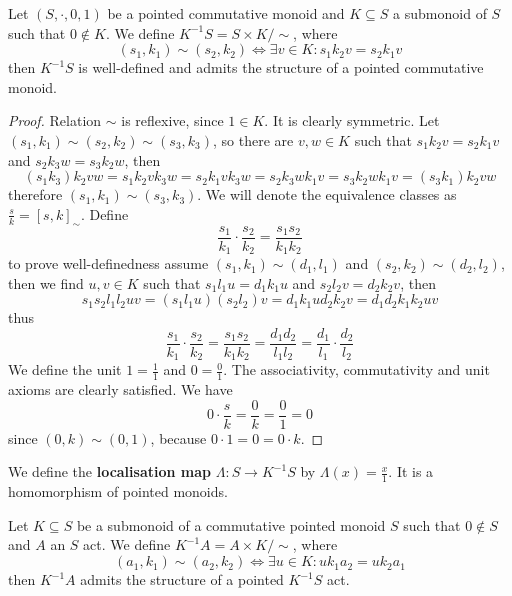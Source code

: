 \begin{proposition}
    Let $(S,\cdot,0,1)$ be a pointed commutative monoid and 
    $K\subseteq S$ a submonoid of $S$ such that $0\not\in K$. 
    We define $K^{-1}S = S\times K/\sim$, where 
    \[
        (s_1,k_1)\sim(s_2,k_2)\iff \exists v\in K : s_1k_2v = s_2k_1v 
    \]
    then $K^{-1}S$ is well-defined and admits the structure of a pointed commutative monoid.
\end{proposition}
\begin{proof}[Proof]
    Relation $\sim$ is reflexive, since $1\in K$. It is clearly symmetric. 
    Let $(s_1,k_1)\sim(s_2,k_2)\sim(s_3,k_3)$, so there are $v,w\in K$ such that 
    $s_1k_2v = s_2k_1v$ and $s_2k_3w = s_3k_2w$, then 
    \[
    (s_1k_3)k_2vw = s_1k_2vk_3w = s_2k_1vk_3w = s_2k_3wk_1v = s_3k_2wk_1v = (s_3k_1)k_2vw
    \]
    therefore $(s_1,k_1)\sim(s_3,k_3)$. We will denote the equivalence classes as
    $\frac{s}{k} = [s,k]_{\sim}$. Define 
    \[
        \frac{s_1}{k_1}\cdot\frac{s_2}{k_2} = \frac{s_1 s_2}{k_1 k_2}
    \]
    to prove well-definedness assume $(s_1,k_1)\sim(d_1,l_1)$ and $(s_2,k_2)\sim(d_2,l_2)$, then 
    we find $u,v\in K$ such that 
    $s_1l_1u=d_1k_1u$ and $s_2l_2v = d_2k_2v$, then 
    \[
    s_1s_2l_1l_2uv = (s_1l_1u)(s_2l_2)v = d_1k_1ud_2k_2v = d_1d_2k_1k_2uv 
    \]
    thus
    \[
        \frac{s_1}{k_1}\cdot\frac{s_2}{k_2} = \frac{s_1s_2}{k_1k_2} = \frac{d_1d_2}{l_1l_2} = \frac{d_1}{l_1}\cdot\frac{d_2}{l_2}
    \]
    We define the unit $1 = \frac{1}{1}$ and $0 = \frac{0}{1}$. The associativity, commutativity and unit axioms are clearly 
    satisfied. We have 
    \[
        0\cdot\frac{s}{k} = \frac{0}{k} = \frac{0}{1} = 0
    \]
    since $(0,k)\sim(0,1)$, because $0\cdot 1 = 0 = 0\cdot k$. 
\end{proof}
\begin{definition}
    We define the \textbf{localisation map} $\Lambda: S \to K^{-1}S$ by $\Lambda(x) = \frac{x}{1}$. It is a 
    homomorphism of pointed monoids.  
\end{definition}
\begin{proposition}
    Let $K\subseteq S$ be a submonoid of a commutative pointed monoid $S$ such that $0\not\in S$ and $A$ an $S$ act. We define 
    $K^{-1}A = A\times K/\sim$, where 
    \[
        (a_1,k_1)\sim(a_2,k_2) \iff \exists u\in K : uk_1 a_2 = uk_2 a_1
    \]
    then $K^{-1}A$ admits the structure of a pointed $K^{-1} S$ act.
\end{proposition}
